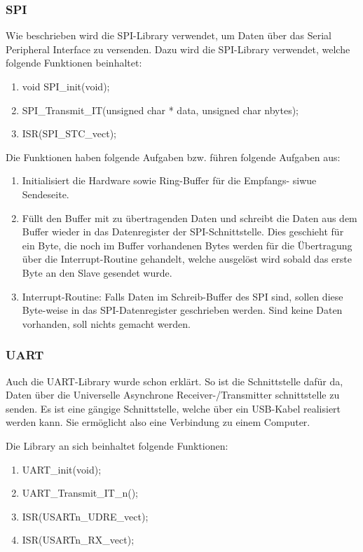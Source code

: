 \subsubsection{SPI}\label{subsubsec:Software_SPI}

Wie beschrieben wird die SPI-Library verwendet, um Daten über das Serial Peripheral Interface zu versenden. Dazu wird die SPI-Library verwendet, welche folgende Funktionen beinhaltet:

\begin{enumerate}
\item void SPI\_init(void);
\item SPI\_Transmit\_IT(unsigned char * data, unsigned char nbytes);
\item ISR(SPI\_STC\_vect);
\end{enumerate}

Die Funktionen haben folgende Aufgaben bzw. führen folgende Aufgaben aus:

\begin{enumerate}
\item Initialisiert die Hardware sowie Ring-Buffer für die Empfangs- siwue Sendeseite.
\item Füllt den Buffer mit zu übertragenden Daten und schreibt die Daten aus dem Buffer wieder in das Datenregister der SPI-Schnittstelle. Dies geschieht für ein Byte, die noch im Buffer vorhandenen Bytes werden für die Übertragung über die Interrupt-Routine gehandelt, welche ausgelöst wird sobald das erste Byte an den Slave gesendet wurde.
\item Interrupt-Routine: Falls Daten im Schreib-Buffer des SPI sind, sollen diese Byte-weise in das SPI-Datenregister geschrieben werden. Sind keine Daten vorhanden, soll nichts gemacht werden.
\end{enumerate}

\subsubsection{UART}\label{subsubsec:Software_UART}

Auch die UART-Library wurde schon erklärt. So ist die Schnittstelle dafür da, Daten über die Universelle Asynchrone Receiver-/Transmitter schnittstelle zu senden. Es ist eine gängige Schnittstelle, welche über ein USB-Kabel realisiert werden kann. Sie ermöglicht also eine Verbindung zu einem Computer.

Die Library an sich beinhaltet folgende Funktionen:

\begin{enumerate}
\item UART\_init(void);
\item UART\_Transmit\_IT\_n();
\item ISR(USARTn\_UDRE\_vect);
\item ISR(USARTn\_RX\_vect);
\end{enumerate}

